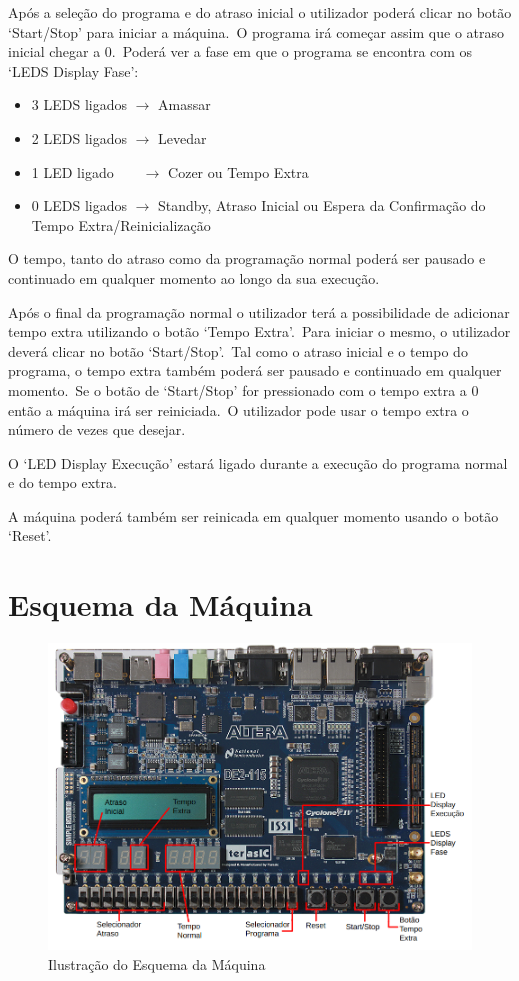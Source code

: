 Após a seleção do programa e do atraso inicial o utilizador poderá clicar no botão `Start/Stop' para iniciar a máquina.\ O programa irá começar assim que o atraso inicial chegar a 0.\ Poderá ver a fase em que o programa se encontra com os `LEDS Display Fase':
\begin{itemize}
    \item 3 LEDS ligados $\rightarrow$ Amassar
    \item 2 LEDS ligados $\rightarrow$ Levedar
    \item 1 LED ligado~~~~$\rightarrow$ Cozer ou Tempo Extra
    \item 0 LEDS ligados $\rightarrow$ Standby, Atraso Inicial ou Espera da Confirmação do Tempo Extra/Reinicialização
\end{itemize}

O tempo, tanto do atraso como da programação normal poderá ser pausado e continuado em qualquer momento ao longo da sua execução.

Após o final da programação normal o utilizador terá a possibilidade de adicionar tempo extra utilizando o botão `Tempo Extra'.\ Para iniciar o mesmo, o utilizador deverá clicar no botão `Start/Stop'.\ Tal como o atraso inicial e o tempo do programa, o tempo extra também poderá ser pausado e continuado em qualquer momento.\ Se o botão de `Start/Stop' for pressionado com o tempo extra a 0 então a máquina irá ser reiniciada.\ O utilizador pode usar o tempo extra o número de vezes que desejar.

O `LED Display Execução' estará ligado durante a execução do programa normal e do tempo extra.

A máquina poderá também ser reinicada em qualquer momento usando o botão `Reset'.

\section{Esquema da Máquina}
\label{sec:esquema-da-maquina}

\begin{figure}[H]
    \center
    \includegraphics[scale=.4]{../images/esquema-placa}\caption{Ilustração do Esquema da Máquina}
    \label{fig:esquema-placa}
\end{figure}

